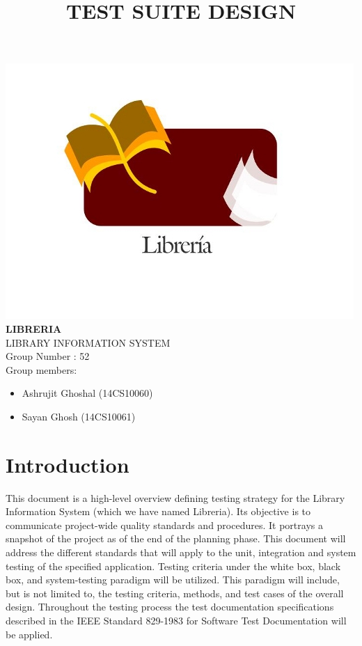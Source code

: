 \documentclass{article}
\title{\textbf{TEST SUITE DESIGN}}
\author{}
\date{}
\begin{document}
\maketitle


\begin{center}
	\includegraphics[scale=0.6]{images/logoLIS_modified.jpg}
	\\
	\textbf{LIBRERIA}\\
	LIBRARY INFORMATION SYSTEM\\
	Group Number : 52\\
	Group members: \\
	\begin{itemize}
		\item \begin{center}Ashrujit Ghoshal (14CS10060)\end{center}
		\item \begin{center}Sayan Ghosh (14CS10061)\end{center}
	\end{itemize}
	
\end{center}
\newpage
\hypertarget{toc}{}
\tableofcontents
\newpage


\section{Introduction}

This document is a high-level overview defining testing strategy for the Library Information System (which we have named Libreria).
Its objective is to communicate project-wide quality standards and procedures. It portrays a snapshot of the
project as of the end of the planning phase. This document will address the different standards that will
apply to the unit, integration and system testing of the specified application. Testing criteria under the white
box, black box, and system-testing paradigm will be utilized. This paradigm will include, but is not limited to,
the testing criteria, methods, and test cases of the overall design. Throughout the testing process the test
documentation specifications described in the IEEE Standard 829-1983 for Software Test Documentation will
be applied.
\end{document}
